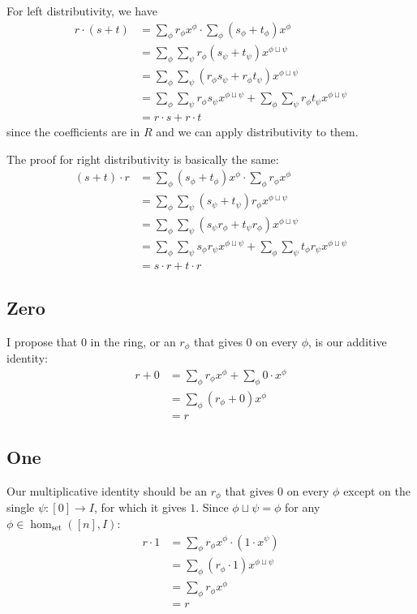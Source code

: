 \documentclass[12pt]{article}
\begin{document}
For left distributivity, we have
\begin{align*}
  r \cdot (s + t)
  &= \sum_{\phi} r_\phi x^\phi \cdot \sum_{\phi} (s_\phi+t_\phi)x^\phi \\
  &= \sum_{\phi} \sum_{\psi} r_\phi(s_\psi+t_\psi) x^{\phi \sqcup \psi} \\
  &= \sum_{\phi} \sum_{\psi} (r_\phi s_\psi + r_\phi t_\psi) x^{\phi \sqcup \psi} \\
  &= \sum_{\phi} \sum_{\psi} r_\phi s_\psi x^{\phi \sqcup \psi} + \sum_{\phi} \sum_{\psi} r_\phi t_\psi x^{\phi \sqcup \psi} \\
  &= r \cdot s + r \cdot t
\end{align*}
since the coefficients are in $R$ and we can apply distributivity to them.

The proof for right distributivity is basically the same:
\begin{align*}
  (s + t) \cdot r
  &= \sum_{\phi} (s_\phi+t_\phi)x^\phi \cdot \sum_{\phi} r_\phi x^\phi \\
  &= \sum_{\phi} \sum_{\psi} (s_\psi+t_\psi)r_\phi x^{\phi \sqcup \psi} \\
  &= \sum_{\phi} \sum_{\psi} (s_\psi r_\phi + t_\psi r_\phi) x^{\phi \sqcup \psi} \\
  &= \sum_{\phi} \sum_{\psi} s_\phi r_\psi x^{\phi \sqcup \psi} + \sum_{\phi} \sum_{\psi} t_\phi r_\psi x^{\phi \sqcup \psi} \\
  &= s \cdot r + t \cdot r
\end{align*}

\subsection{Zero}

I propose that $0$ in the ring, or an $r_\phi$ that gives $0$ on every $\phi$, is our additive identity:
\begin{align*}
  r+0
  &= \sum_{\phi} r_\phi x^\phi + \sum_{\phi} 0 \cdot x^\phi \\
  &= \sum_{\phi} (r_\phi+0) x^\phi \\
  &= r
\end{align*}

\subsection{One}

Our multiplicative identity should be an $r_\phi$ that gives $0$ on every $\phi$
except on the single $\psi: [0] \to I$, for which it gives $1$.
Since $\phi \sqcup \psi = \phi$ for any $\phi \in \hom_{\text{set}}([n], I)$:
\begin{align*}
  r \cdot 1
  &= \sum_{\phi} r_\phi x^\phi \cdot (1 \cdot x^\psi) \\
  &= \sum_{\phi} (r_\phi \cdot 1)x^{\phi \sqcup \psi} \\
  &= \sum_{\phi} r_\phi x^\phi \\
  &= r
\end{align*}
\end{document}
